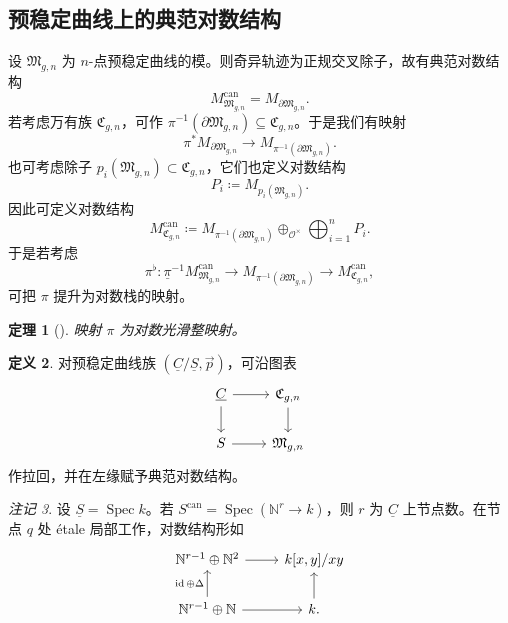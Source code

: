 \documentclass{amsart}
\newtheorem{thm}{定理}[section]
\theoremstyle{definition}
\newtheorem{defn}[thm]{定义}
\theoremstyle{remark}
\newtheorem{rmk}[thm]{注记}
\theoremstyle{plain}
\theoremstyle{definition}
\theoremstyle{remark}
\newcommand{\N}{\mathbb{N}}
\newcommand{\mc}[1]{\mathcal{#1}}
\newcommand{\mf}[1]{\mathfrak{#1}}
\newcommand{\on}[1]{\operatorname{#1}}
\newcommand{\ul}[1]{\underline{#1}}
\newcommand{\1}{\mathbf{1}}
\newcommand{\2}{\mathbf{2}}
\newcommand{\3}{\mathbf{3}}
\DeclareMathOperator{\Spec}{Spec}
\begin{document}
\subsection{预稳定曲线上的典范对数结构}%
\label{sub:Canonical log structures on prestable curves}

设 \(\mf{M}_{g,n}\) 为 \(n\)-点预稳定曲线的模。则奇异轨迹为正规交叉除子，故有典范对数结构
\[ M_{\mf{M}_{g,n}}^{\on{can}} = M_{\partial \mf{M}_{g,n}}. \]
若考虑万有族 \(\mf{C}_{g,n}\)，可作 \(\pi^{-1}(\partial \mf{M}_{g,n}) \subseteq \mf{C}_{g,n}\)。于是我们有映射
\[ \pi^* M_{\partial \mf{M}_{g,n}} \to M_{\pi^{-1}(\partial \mf{M}_{g,n})}. \]
也可考虑除子 \(p_i(\mf{M}_{g,n}) \subset \mf{C}_{g,n}\)，它们也定义对数结构
\[ P_i \coloneqq M_{p_i(\mf{M}_{g,n})}. \]
因此可定义对数结构
\[ M_{\mf{C}_{g,n}}^{\on{can}} \coloneqq M_{\pi^{-1}(\partial\mf{M}_{g,n})} \oplus_{\mc{O}^{\times}} \bigoplus_{i=1}^n P_i. \]
于是若考虑
\[ \pi^{\flat} \colon \ul{\pi}^{-1} M_{\mf{M}_{g,n}}^{\on{can}} \to M_{\pi^{-1}(\partial \mf{M}_{g,n})} \to M_{\mf{C}_{g,n}}^{\on{can}}, \]
可把 \(\pi\) 提升为对数栈的映射。

\begin{thm}[{\cite{FKato2000}}]
    映射 \(\pi\) 为对数光滑整映射。
\end{thm}

\begin{defn}
    对预稳定曲线族 \((\ul{C}/\ul{S}, \vec{p})\)，可沿图表
    \begin{equation*}
    \begin{tikzcd}
        \ul{C} \ar{r} \ar{d} & \mf{C}_{g,n} \ar{d} \\
        S \ar{r} & \mf{M}_{g,n}
    \end{tikzcd}
    \end{equation*}
    作拉回，并在左缘赋予典范对数结构。
\end{defn}

\begin{rmk}
    设 \(\ul{S} = \Spec k\)。若 \(S^{\on{can}} = \Spec (\N^r \to k)\)，则 \(r\) 为 \(\ul{C}\) 上节点数。在节点 \(q\) 处 \'etale 局部工作，对数结构形如
    \begin{equation*}
    \begin{tikzcd}
        \N^{r-1} \oplus \N^2 \ar{r} & k[x,y]/xy \\
        \N^{r-1} \oplus \N \ar{u}{\on{id}\oplus\Delta} \ar{r} & k \ar{u}.
    \end{tikzcd}
    \end{equation*}
\end{rmk}
\end{document}
